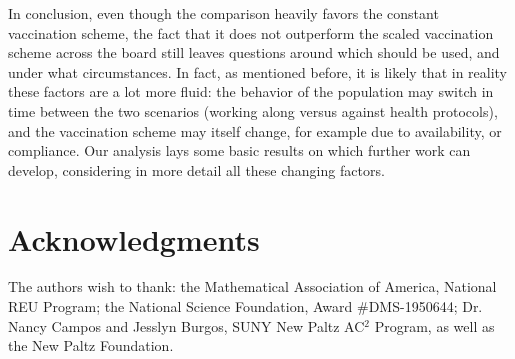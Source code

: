 \documentclass[10pt]{article}
\begin{document}
In conclusion, even though the comparison heavily favors the constant vaccination scheme, the fact that it does not outperform the scaled vaccination scheme across the board still leaves questions around which should be used, and under what circumstances. In fact, as mentioned before, it is likely that in reality these factors are a lot more fluid: the behavior of the population may switch in time between the two scenarios (working along versus against health protocols), and the vaccination scheme may itself change, for example due to availability, or compliance. Our analysis lays some basic results on which further work can develop, considering in more detail all these changing factors.


\section*{Acknowledgments}

The authors wish to thank: the Mathematical Association of America, National REU Program; the National Science Foundation, Award \#DMS-1950644; Dr. Nancy Campos and Jesslyn Burgos, SUNY New Paltz AC$^2$ Program, as well as the New Paltz Foundation.





\end{document}
